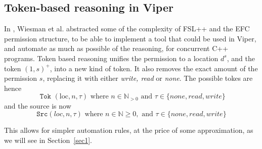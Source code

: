 \subsection{Token-based reasoning in Viper}
In \cite{pascal}, Wiesman et al. abstracted some of the complexity of FSL++ and the EFC permission structure, to be able to implement a tool that could be used in Viper, and automate as much as possible of the reasoning, for concurrent C++ programs. Token based reasoning unifies the permission to a location $d^s$, and the token $(1, s)^+$, into a new kind of token. It also removes the exact amount of the permission $s$, replacing it with either \emph{write, read} or \emph{none}. The possible tokes are hence 
\[\texttt { Tok }(\text {loc}, n, \tau) \text { where } n \in \mathbb{N}_{>0} \text { and } \tau \in\{ {none, read, write}\}\]
and the source is now 
\[\texttt{Src}(l o c, n, \tau) \text { where } n \in \mathbb{N} \geq 0, \text { and } \tau \in\{ {none, read, write}\}\]

This allows for simpler automation rules, at the price of some approximation, as we will see in Section~\ref{sec1}.

